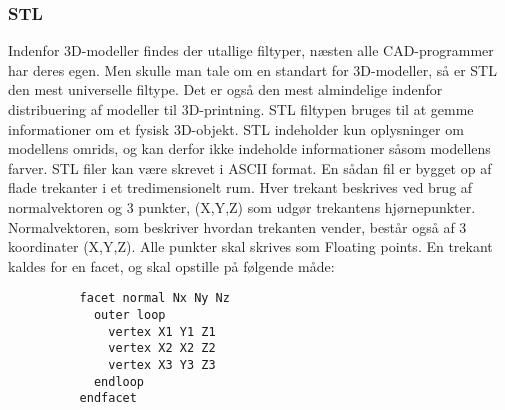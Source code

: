 
\subsubsection{STL} %

Indenfor 3D-modeller findes der utallige filtyper, næsten alle CAD-programmer har deres egen. Men skulle man tale om en standart for 3D-modeller, så er STL den mest universelle filtype. Det er også den mest almindelige indenfor distribuering af modeller til 3D-printning. \autocite{_getting_????}
STL filtypen bruges til at gemme informationer om et fysisk 3D-objekt. STL indeholder kun oplysninger om modellens omrids, og kan derfor ikke indeholde informationer såsom modellens farver. 
STL filer kan være skrevet i ASCII format. 
En sådan fil er bygget op af flade trekanter i et tredimensionelt rum. 
Hver trekant beskrives ved brug af normalvektoren og 3 punkter, (X,Y,Z) som udgør trekantens hjørnepunkter. Normalvektoren, som beskriver hvordan trekanten vender, består også af 3 koordinater (X,Y,Z). Alle punkter skal skrives som Floating points\autocite{_stla_????}.
En trekant kaldes for en facet, og skal opstille på følgende måde:
\begin{lstlisting}
          facet normal Nx Ny Nz
            outer loop
              vertex X1 Y1 Z1
              vertex X2 X2 Z2
              vertex X3 Y3 Z3
            endloop
          endfacet
\end{lstlisting}



